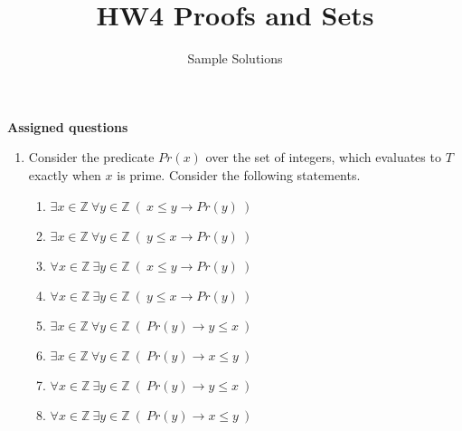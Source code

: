 

\title{HW4 Proofs and Sets}
\date{Sample Solutions}


\maketitle
\thispagestyle{fancy}

{\bf Assigned questions}

\begin{enumerate}
   \item Consider the predicate $Pr(x)$ over the set of integers, which evaluates to $T$ exactly when 
   $x$ is prime. Consider the following statements.
   
    \begin{multicols}{2}
    \begin{enumerate}[label=(\roman*)]
        \item $\exists x \in \mathbb{Z}~ \forall y \in \mathbb{Z}~(~x \leq y \to Pr(y)~)$
        \item $\exists x \in \mathbb{Z}~ \forall y \in \mathbb{Z}~(~y \leq x \to Pr(y)~)$
        \item $\forall x \in \mathbb{Z}~ \exists y \in \mathbb{Z}~(~x \leq y \to Pr(y)~)$
        \item $\forall x \in \mathbb{Z}~ \exists y \in \mathbb{Z}~(~y \leq x \to Pr(y)~)$
        \item $\exists x \in \mathbb{Z}~ \forall y \in \mathbb{Z}~(~Pr(y) \to y \leq x~)$
        \item $\exists x \in \mathbb{Z}~ \forall y \in \mathbb{Z}~(~Pr(y) \to x \leq y~)$
        \item $\forall x \in \mathbb{Z}~ \exists y \in \mathbb{Z}~(~Pr(y) \to y \leq x~)$
        \item $\forall x \in \mathbb{Z}~ \exists y \in \mathbb{Z}~(~Pr(y) \to x \leq y~)$
    \end{enumerate}
    \end{multicols}
   
   \begin{enumerate}
   

\end{enumerate}
\end{enumerate}
